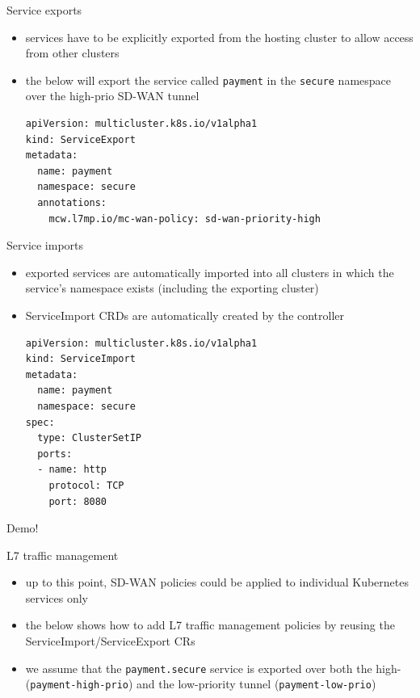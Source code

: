 \documentclass[presentation]{beamer}
\begin{document}
\begin{frame}[label={sec:org4159600},fragile]{Service exports}
 \begin{itemize}
\item services have to be explicitly exported from the hosting cluster to allow access from other
clusters
\item the below will export the service called \texttt{payment} in the \texttt{secure} namespace over the high-prio
SD-WAN tunnel
\lstset{language=yaml,label= ,caption= ,captionpos=b,numbers=none}
\begin{lstlisting}
apiVersion: multicluster.k8s.io/v1alpha1
kind: ServiceExport
metadata:
  name: payment
  namespace: secure
  annotations:
    mcw.l7mp.io/mc-wan-policy: sd-wan-priority-high
\end{lstlisting}
\end{itemize}
\end{frame}

\begin{frame}[label={sec:org6577dd6},fragile]{Service imports}
 \begin{itemize}
\item exported services are automatically imported into all clusters in which the service's namespace
exists (including the exporting cluster)
\item ServiceImport CRDs are automatically created by the controller
\lstset{language=yaml,label= ,caption= ,captionpos=b,numbers=none}
\begin{lstlisting}
apiVersion: multicluster.k8s.io/v1alpha1
kind: ServiceImport
metadata:
  name: payment
  namespace: secure
spec:
  type: ClusterSetIP
  ports:
  - name: http
    protocol: TCP
    port: 8080
\end{lstlisting}
\end{itemize}
\end{frame}

\begin{frame}[label={sec:orgb2630b0}]{Demo!}
\end{frame}

\begin{frame}[label={sec:org15e3e38},fragile]{L7 traffic management}
 \begin{itemize}
\item up to this point, SD-WAN policies could be applied to individual Kubernetes services only
\item the below shows how to add L7 traffic management policies by reusing the
ServiceImport/ServiceExport CRs
\item we assume that the \texttt{payment.secure} service is exported over both the high- (\texttt{payment-high-prio})
and the low-priority tunnel (\texttt{payment-low-prio})
\end{itemize}
\end{frame}
\end{document}
